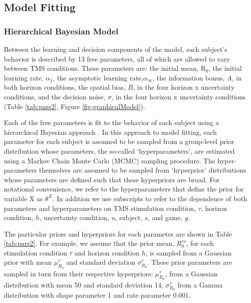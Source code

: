 \documentclass[12pt]{article}
\begin{document}
\subsection*{Model Fitting}
\subsubsection*{Hierarchical Bayesian Model}
Between the learning and decision components of the model, each subject's behavior is described by 13 free parameters, all of which are allowed to vary between TMS conditions.  These parameters are: the initial mean, R$_0$, the initial learning rate, $\alpha_1$, the asymptotic learning rate,$\alpha_{\infty}$, the information bonus, $A$, in both horizon conditions, the spatial bias, $B$, in the four horizon x uncertainty conditions, and the decision noise, $\sigma$, in the four horizon x uncertainty conditions (Table \ref{tab:pars2}, Figure \ref{fig:graphicalModel}). 

Each of the free parameters is fit to the behavior of each subject using a hierarchical Bayesian approach \cite{Lee2014-yh}.  In this approach to model fitting, each parameter for each subject is assumed to be sampled from a group-level prior distribution whose parameters, the so-called `hyperparameters', are estimated using a Markov Chain Monte Carlo (MCMC) sampling procedure. The hyper-parameters themselves are assumed to be sampled from `hyperprior' distributions whose parameters are defined such that these hyperpriors are broad.  For notational convenience, we refer to the hyperparameters that define the prior for variable X as $\theta^X$.  In addition we use subscripts to refer to the dependence of both parameters and hyperparameters on TMS stimulation condition, $\tau$, horizon condition, $h$, uncertainty condition, $u$, subject, $s$, and game, $g$.  

The particular priors and hyperpriors for each parameter are shown in Table \ref{tab:pars2}. For example, we assume that the prior mean, $R_0^{\tau s}$, for each stimulation condition $\tau$ and horizon condition $h$, is sampled from a Gaussian prior with mean $\mu_{R_0}^{\tau}$ and standard deviation $\sigma_{R_0}^\tau$. These prior parameters are sampled in turn from  their respective hyperpriors: $\mu_{R_0}^{\tau}$, from a Gaussian distribution with mean 50 and standard deviation 14, $\sigma_{R_0}^\tau$ from a Gamma distribution with shape parameter 1 and rate parameter 0.001.
\end{document}

